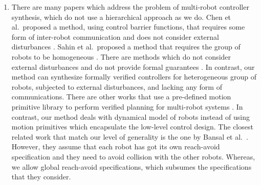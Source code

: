 \begin{enumerate}[(1)]
	\item There are many papers which address the problem of multi-robot controller synthesis, which do not use a hierarchical approach as we do.
	Chen et al.\ proposed a method, using control barrier functions, that requires some form of inter-robot communication and does not consider external disturbances \cite{Chen2018cbf}.
	Sahin et al.\ proposed a method that requires the group of robots to be homogeneous \cite{Shahin2017cltl}.
	There are methods which do not consider external disturbances and do not provide formal guarantees \cite{jackson2020scalable}.
	In contrast, our method can synthesize formally verified controllers for heterogeneous group of robots, subjected to external disturbances, and lacking any form of communications. There are other works that use a pre-defined motion primitive library to perform verified planning for multi-robot systems \cite{saha2016implan,BanusicMPSZ19pgcd}. In contrast, our method deals with dynamical model of robots instead of using motion primitives which encapsulate the low-level control design. %
	The closest related work that match our level of generality is the one by Bansal et al.\ \cite{bansal2017safe}.
	However, they assume that each robot has got its own reach-avoid specification and they need to avoid collision with the other robots.
	Whereas, we allow global reach-avoid specifications, which subsumes the specifications that they consider.

\end{enumerate}
